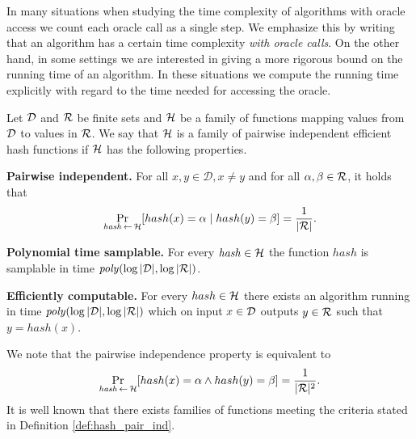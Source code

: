 In many situations when studying the time complexity of algorithms with oracle access we count each oracle call as a single step.
We emphasize this by writing that an algorithm has a certain time complexity \textit{with oracle calls}.
On the other hand, in some settings we are interested in giving a more rigorous bound on the running time of an algorithm.
In these situations we compute the running time explicitly with regard to the time needed for accessing the oracle.

\begin{definition}
  \label{def:hash_pair_ind}
Let $\mathcal{D}$ and $\mathcal{R}$ be finite sets and $\mathcal{H}$ be a family of functions mapping values from $\mathcal{D}$ to values in $\mathcal{R}$.
We say that $\mathcal{H}$ is a \textnormal{family of pairwise independent efficient hash functions}
if $\mathcal{H}$ has the following properties.

\textbf{Pairwise independent.} For all $x, y \in \mathcal{D}, x \neq y$ and for all $\alpha, \beta \in \mathcal{R}$, it holds that
\begin{displaymath}
\underset{\hash \la0 \cH}{\Pr}[hash(x) = \alpha \mid hash(y) = \beta] = \frac{1}{|\cR|}.
\end{displaymath}

\textbf{Polynomial time samplable.} For every $\mathit{hash} \in \mathcal{H}$ the function $\mathit{hash}$ is samplable in time $\operatorname{\mathit{poly}}(\log|\mathcal{D}|, \log|\mathcal{R}|)$.

\textbf{Efficiently computable.}
For every $hash \in \mathcal{H}$ there exists an algorithm running in time $\mathit{poly}(\log|\mathcal{D}|, \log|\mathcal{R}|)$ which
on input $x \in \mathcal{D}$ outputs $y \in \mathcal{R}$ such that $y = hash(x)$.
\end{definition}

We note that the pairwise independence property is equivalent to
\begin{displaymath}
\underset{\hash \la0 \cH}{\Pr}[hash(x) = \alpha \land hash(y) = \beta] = \frac{1}{|\cR|^2}.
\end{displaymath}
It is well known \cite{Carter:1977:UCH:800105.803400} that there exists families of functions meeting the criteria stated in Definition \ref{def:hash_pair_ind}.

